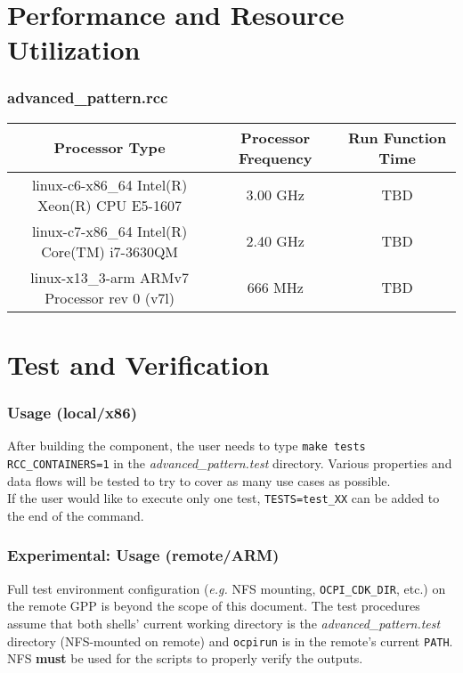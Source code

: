 \documentclass{article}
\def\comp{advanced\_pattern}
\begin{document}
\section*{Performance and Resource Utilization}
\subsubsection*{\comp.rcc}
\begin{scriptsize}
	\begin{tabular}{|c|c|c|}
		\hline
		\rowcolor{blue}
		Processor Type                                & Processor Frequency & Run Function Time \\
		\hline
		linux-c6-x86\_64 Intel(R) Xeon(R) CPU E5-1607 & 3.00 GHz            & TBD               \\
		\hline
		linux-c7-x86\_64 Intel(R) Core(TM) i7-3630QM  & 2.40 GHz            & TBD               \\
		\hline
		linux-x13\_3-arm ARMv7 Processor rev 0 (v7l)  & 666 MHz             & TBD               \\
		\hline
	\end{tabular}
\end{scriptsize}
\fi
\section*{Test and Verification}
\subsubsection*{Usage (local/x86)}
After building the component, the user needs to type \verb+make tests RCC_CONTAINERS=1+ in the \textit{advanced\_pattern.test} directory. Various properties and data flows will be tested to try to cover as many use cases as possible. \\

If the user would like to execute only one test, \verb+TESTS=test_XX+ can be added to the end of the command.
\subsubsection*{\textbf{Experimental}: Usage (remote/ARM)}
Full test environment configuration (\textit{e.g.} NFS mounting, \verb+OCPI_CDK_DIR+, etc.) on the remote GPP is beyond the scope of this document. The test procedures assume that both shells' current working directory is the \textit{advanced\_pattern.test} directory (NFS-mounted on remote) and \verb+ocpirun+ is in the remote's current \verb+PATH+. NFS \textbf{must} be used for the scripts to properly verify the outputs. \\
\end{document}
